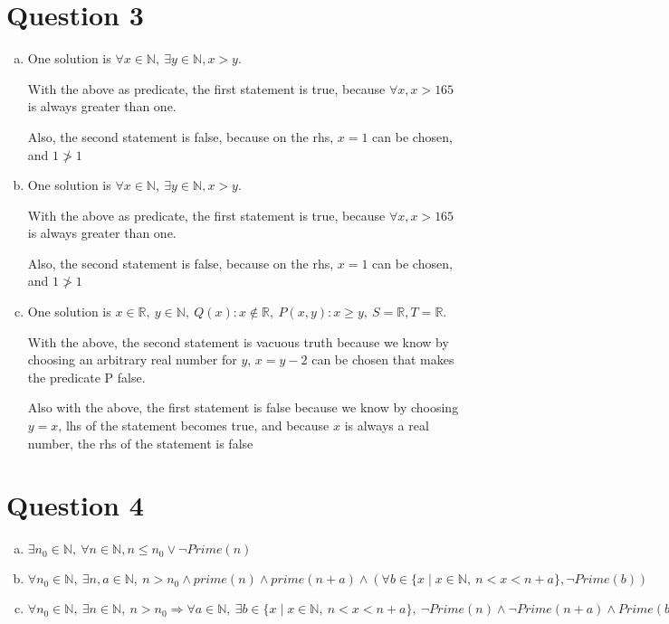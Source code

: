 \documentclass[12pt]{article}
\begin{document}
\section*{Question 3}
\begin{enumerate}[a.]
    \item

    One solution is $\forall x \in \mathbb{N},\:\exists y \in \mathbb{N}, x > y$.

    With the above as predicate, the first statement is true, because $\forall x, x > 165$ is
    always greater than one.

    Also, the second statement is false, because on the rhs, $x = 1$ can be chosen, and $1 \ngtr 1$

    \item

    One solution is $\forall x \in \mathbb{N},\:\exists y \in \mathbb{N}, x > y$.

    With the above as predicate, the first statement is true, because $\forall x, x > 165$ is
    always greater than one.

    Also, the second statement is false, because on the rhs, $x = 1$ can be chosen, and $1 \ngtr 1$

    \item

    One solution is $x \in \mathbb{R},\: y \in \mathbb{N},\:Q(x): x \notin \mathbb{R},\:P(x,y): x \geq y,\:S = \mathbb{R}, T = \mathbb{R}$.

    With the above, the second statement is vacuous truth because we know by choosing an arbitrary real number for $y$,
    $x = y - 2$ can be chosen that makes the predicate P false.

    Also with the above, the first statement is false because we know by choosing $y = x$,
    lhs of the statement becomes true, and because $x$ is always a real number, the rhs of the statement is false


\end{enumerate}

\section*{Question 4}
\begin{enumerate}[a.]
    \item

    $\exists n_0 \in \mathbb{N},\: \forall n \in \mathbb{N}, n \leq n_0 \lor \neg Prime(n)$

    \item

    $\forall n_0 \in \mathbb{N},\:\exists n,a \in \mathbb{N},\:n > n_0 \land prime(n) \land prime(n+a) \land (\forall b \in \{x \mid x \in \mathbb{N},\: n<x<n+a\}, \neg Prime(b))$

    \item

    $\forall n_0 \in \mathbb{N},\: \exists n \in \mathbb{N},\: n > n_0 \Rightarrow \forall a \in \mathbb{N},\:\exists b \in \{x \mid x \in \mathbb{N},\: n<x<n+a\},\:\neg Prime(n) \land \neg Prime(n+a) \land Prime(b)$


\end{enumerate}
\end{document}
